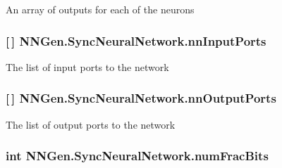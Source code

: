 An array of outputs for each of the neurons 

\hypertarget{class_n_n_gen_1_1_sync_neural_network_a6d72194820925ead7f84387e53390f9d}{}
\subsubsection[{nn\+Input\+Ports}]{ \mbox{[}$\,$\mbox{]} N\+N\+Gen.\+Sync\+Neural\+Network.\+nn\+Input\+Ports\hspace{0.3cm}{\ttfamily [get]}}\label{class_n_n_gen_1_1_sync_neural_network_a6d72194820925ead7f84387e53390f9d}


The list of input ports to the network 

\hypertarget{class_n_n_gen_1_1_sync_neural_network_a9e0690fdd6bd2ee365d76b2b9d3ad593}{}
\subsubsection[{nn\+Output\+Ports}]{ \mbox{[}$\,$\mbox{]} N\+N\+Gen.\+Sync\+Neural\+Network.\+nn\+Output\+Ports\hspace{0.3cm}{\ttfamily [get]}}\label{class_n_n_gen_1_1_sync_neural_network_a9e0690fdd6bd2ee365d76b2b9d3ad593}


The list of output ports to the network 

\hypertarget{class_n_n_gen_1_1_sync_neural_network_a82e208d521ab24cb49b0fdfa1ed285c1}{}
\subsubsection[{num\+Frac\+Bits}]{\setlength{\rightskip}{0pt plus 5cm}int N\+N\+Gen.\+Sync\+Neural\+Network.\+num\+Frac\+Bits\hspace{0.3cm}{\ttfamily [get]}}\label{class_n_n_gen_1_1_sync_neural_network_a82e208d521ab24cb49b0fdfa1ed285c1}


